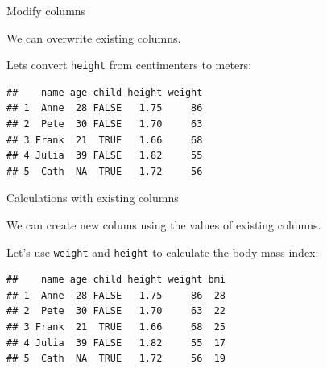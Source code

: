 \documentclass[ignorenonframetext,]{beamer}
\newenvironment{Shaded}{\begin{snugshade}}{\end{snugshade}}
\newcommand{\DecValTok}[1]{\textcolor[rgb]{0.00,0.00,0.81}{#1}}
\newcommand{\KeywordTok}[1]{\textcolor[rgb]{0.13,0.29,0.53}{\textbf{#1}}}
\newcommand{\NormalTok}[1]{#1}
\newcommand{\OperatorTok}[1]{\textcolor[rgb]{0.81,0.36,0.00}{\textbf{#1}}}
\newcommand{\StringTok}[1]{\textcolor[rgb]{0.31,0.60,0.02}{#1}}
\begin{document}
\begin{frame}[fragile]{Modify columns}
\protect\hypertarget{modify-columns}{}

We can overwrite existing columns.

Lets convert \texttt{height} from centimenters to meters:

\begin{Shaded}
\end{Shaded}

\begin{verbatim}
##    name age child height weight
## 1  Anne  28 FALSE   1.75     86
## 2  Pete  30 FALSE   1.70     63
## 3 Frank  21  TRUE   1.66     68
## 4 Julia  39 FALSE   1.82     55
## 5  Cath  NA  TRUE   1.72     56
\end{verbatim}

\end{frame}

\begin{frame}[fragile]{Calculations with existing columns}
\protect\hypertarget{calculations-with-existing-columns}{}

We can create new colums using the values of existing columns.

Let's use \texttt{weight} and \texttt{height} to calculate the body mass
index:

\begin{Shaded}
\end{Shaded}

\begin{verbatim}
##    name age child height weight bmi
## 1  Anne  28 FALSE   1.75     86  28
## 2  Pete  30 FALSE   1.70     63  22
## 3 Frank  21  TRUE   1.66     68  25
## 4 Julia  39 FALSE   1.82     55  17
## 5  Cath  NA  TRUE   1.72     56  19
\end{verbatim}

\end{frame}
\end{document}

